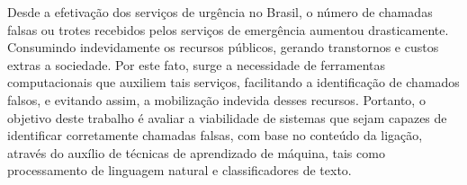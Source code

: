 Desde a efetivação dos serviços de urgência no Brasil, o número de chamadas falsas ou trotes recebidos pelos serviços de emergência aumentou drasticamente. Consumindo indevidamente os recursos públicos, gerando transtornos e custos extras a sociedade. Por este fato, surge a necessidade de ferramentas computacionais que auxiliem tais serviços, facilitando a identificação de chamados falsos, e evitando assim, a mobilização indevida desses recursos. Portanto, o objetivo deste trabalho é avaliar a viabilidade de sistemas que sejam capazes de identificar corretamente chamadas falsas, com base no conteúdo da ligação, através do auxílio de técnicas de aprendizado de máquina, tais como processamento de linguagem natural e classificadores de texto.

